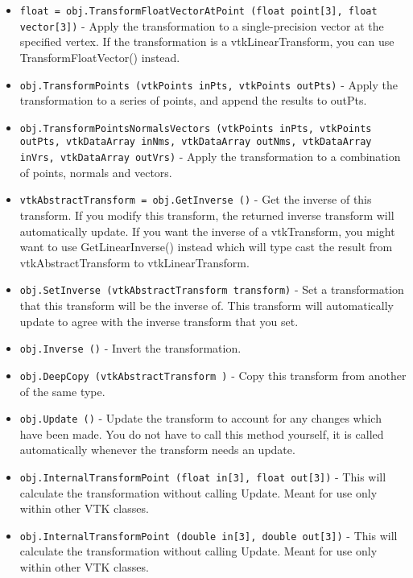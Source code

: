 \begin{itemize}
\item  \verb|float = obj.TransformFloatVectorAtPoint (float point[3], float vector[3])| -  Apply the transformation to a single-precision vector at the specified
 vertex.  If the transformation is a vtkLinearTransform, you can use
 TransformFloatVector() instead.

\item  \verb|obj.TransformPoints (vtkPoints inPts, vtkPoints outPts)| -  Apply the transformation to a series of points, and append the
 results to outPts.  

\item  \verb|obj.TransformPointsNormalsVectors (vtkPoints inPts, vtkPoints outPts, vtkDataArray inNms, vtkDataArray outNms, vtkDataArray inVrs, vtkDataArray outVrs)| -  Apply the transformation to a combination of points, normals
 and vectors.  

\item  \verb|vtkAbstractTransform = obj.GetInverse ()| -  Get the inverse of this transform.  If you modify this transform,
 the returned inverse transform will automatically update.  If you
 want the inverse of a vtkTransform, you might want to use
 GetLinearInverse() instead which will type cast the result from
 vtkAbstractTransform to vtkLinearTransform.

\item  \verb|obj.SetInverse (vtkAbstractTransform transform)| -  Set a transformation that this transform will be the inverse of.
 This transform will automatically update to agree with the 
 inverse transform that you set.

\item  \verb|obj.Inverse ()| -  Invert the transformation.

\item  \verb|obj.DeepCopy (vtkAbstractTransform )| -  Copy this transform from another of the same type.

\item  \verb|obj.Update ()| -  Update the transform to account for any changes which
 have been made.  You do not have to call this method 
 yourself, it is called automatically whenever the
 transform needs an update.

\item  \verb|obj.InternalTransformPoint (float in[3], float out[3])| -  This will calculate the transformation without calling Update.
 Meant for use only within other VTK classes.

\item  \verb|obj.InternalTransformPoint (double in[3], double out[3])| -  This will calculate the transformation without calling Update.
 Meant for use only within other VTK classes.


\end{itemize}
